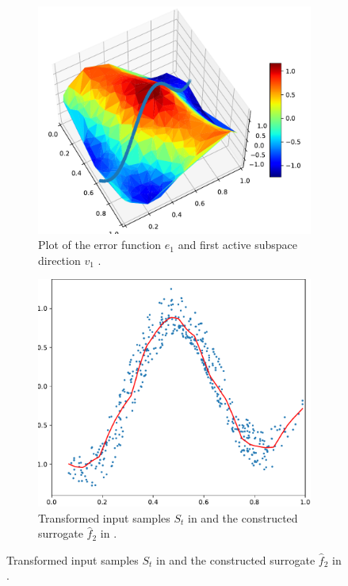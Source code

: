 \documentclass[
  a4paper,  %
  twoside,  %
  bibliography=totoc,
  headsepline,
  cleardoublepage=empty,
  parskip=half,
  draft=false
]{scrbook}
\begin{document}
\begin{mdframed}[style=style]
\begin{figure}[H]
\begin{subfigure}{.5\textwidth}
  \centering
  \includegraphics[width=.8\linewidth]{graphics/pipeline_current_2}
  \caption{Plot of the error function $e_1$ and first active subspace direction $v_1$ \darkblue.}
\label{fig:pipeline_current_2}
\end{subfigure}%
\begin{subfigure}{.5\textwidth}
  \centering
  \includegraphics[width=.8\linewidth]{graphics/pipeline_local_2}
  \caption{Transformed input samples $S_t$ in \darkblue and the constructed surrogate $\hat{f}_2$ in \red.}
\label{fig:pipeline_local_2}
\end{subfigure}
\delimit
{}
\label{fig:pipeline_2}
\end{figure}
\end{mdframed}
\end{document}
